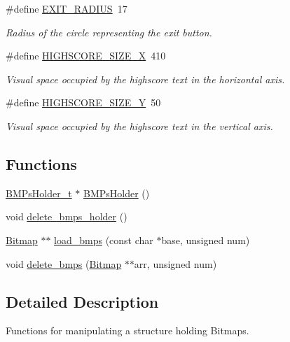 \begin{DoxyCompactItemize}
\#define \hyperlink{group___b_m_ps_holder_ga7c73a85659bf774239d3897ab04e68de}{E\+X\+I\+T\+\_\+\+R\+A\+D\+I\+US}~17
\begin{DoxyCompactList}\small\item\em Radius of the circle representing the exit button. \end{DoxyCompactList}\item 
\#define \hyperlink{group___b_m_ps_holder_gaaa856bb92cc9efc1e6cffeee78fe19b6}{H\+I\+G\+H\+S\+C\+O\+R\+E\+\_\+\+S\+I\+Z\+E\+\_\+X}~410
\begin{DoxyCompactList}\small\item\em Visual space occupied by the highscore text in the horizontal axis. \end{DoxyCompactList}\item 
\#define \hyperlink{group___b_m_ps_holder_ga58bb49ecfe4e566c5c282e55faa900dc}{H\+I\+G\+H\+S\+C\+O\+R\+E\+\_\+\+S\+I\+Z\+E\+\_\+Y}~50
\begin{DoxyCompactList}\small\item\em Visual space occupied by the highscore text in the vertical axis. \end{DoxyCompactList}\end{DoxyCompactItemize}
\subsection*{Functions}
\begin{DoxyCompactItemize}
\item 
\hyperlink{struct_b_m_ps_holder__t}{B\+M\+Ps\+Holder\+\_\+t} $\ast$ \hyperlink{group___b_m_ps_holder_gafd662085ea52a83586cddd30b6423c01}{B\+M\+Ps\+Holder} ()
\item 
void \hyperlink{group___b_m_ps_holder_gaa0a362e75eb034aa78e675ecb1b9c6da}{delete\+\_\+bmps\+\_\+holder} ()
\item 
\hyperlink{struct_bitmap}{Bitmap} $\ast$$\ast$ \hyperlink{group___b_m_ps_holder_gab74a07b3201edddc82762946608675a5}{load\+\_\+bmps} (const char $\ast$base, unsigned num)
\item 
void \hyperlink{group___b_m_ps_holder_ga72dfdb9916627f68651174c037680533}{delete\+\_\+bmps} (\hyperlink{struct_bitmap}{Bitmap} $\ast$$\ast$arr, unsigned num)
\end{DoxyCompactItemize}


\subsection{Detailed Description}
Functions for manipulating a structure holding Bitmaps. 

